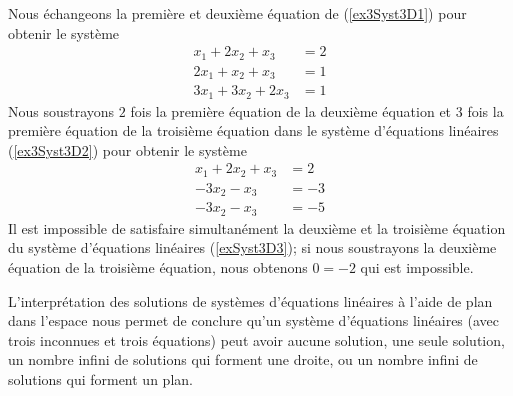 {\begin{egg}
Nous échangeons la première et deuxième équation de (\ref{ex3Syst3D1}) pour
obtenir le système
\begin{equation}\label{ex3Syst3D2}
\begin{split}
x_1 + 2x_2 + x_3 &= 2\\
2x_1 + x_2 + x_3 &= 1\\
3x_1 + 3x_2 + 2x_3 &= 1
\end{split}
\end{equation}
Nous soustrayons $2$ fois la première équation de la deuxième équation et
$3$ fois la première équation de la troisième équation dans le système
d'équations linéaires (\ref{ex3Syst3D2}) pour obtenir le système
\begin{equation}\label{ex3Syst3D3}
\begin{split}
x_1 + 2x_2 + x_3 &= 2\\
-3x_2 - x_3 &= -3\\
-3x_2 - x_3 &= -5
\end{split}
\end{equation}
Il est impossible de satisfaire simultanément la deuxième et la
troisième équation du système d'équations linéaires (\ref{exSyst3D3});
si nous soustrayons la deuxième équation de la troisième équation,
nous obtenons $0=-2$ qui est impossible.

\end{egg}

L'interprétation des solutions de systèmes d'équations linéaires à
l'aide de plan dans l'espace nous permet de conclure qu'un système
d'équations linéaires (avec trois inconnues et trois équations) peut
avoir aucune solution, une seule solution, un nombre infini de
solutions qui forment une droite, ou un nombre infini de solutions qui
forment un plan.

}
